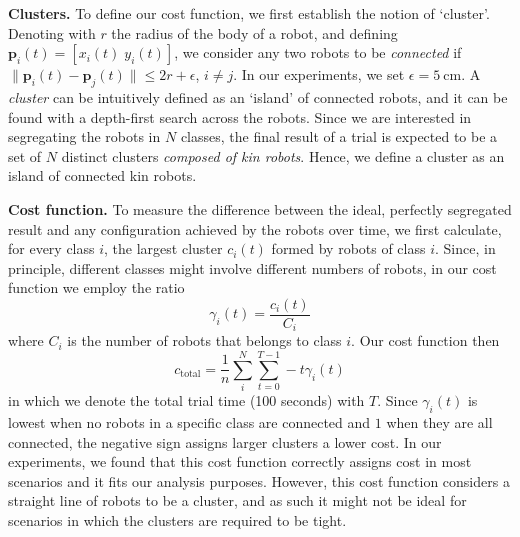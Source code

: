 \documentclass[conference]{IEEEtran}
\newcommand{\myparagraph}[1]{\textbf{#1.}}
\renewcommand{\vec}[1]{\ensuremath{\mathbf{#1}}}
\begin{document}
\myparagraph{Clusters}
To define our cost function, we first establish the notion of
`cluster'. Denoting with $r$ the radius of the body of a robot, and defining
$\vec{p}_i(t) = [x_i(t)\;y_i(t)]$, we consider any two robots to be
\emph{connected} if $\lVert\vec{p}_i(t) - \vec{p}_j(t)\rVert \le 2r + \epsilon$,
$i \ne j$. In our experiments, we set $\epsilon = \SI{5}{\centi\meter}$.  A
\emph{cluster} can be intuitively defined as an `island' of connected robots,
and it can be found with a depth-first search across the robots. Since we are
interested in segregating the robots in $N$ classes, the final result of a trial
is expected to be a set of $N$ distinct clusters \emph{composed of kin
  robots}. Hence, we define a cluster as an island of connected kin robots.

\myparagraph{Cost function}
To measure the difference between the ideal, perfectly segregated result and any
configuration achieved by the robots over time, we first calculate, for every
class $i$, the largest cluster $c_i(t)$ formed by robots of class $i$.  Since,
in principle, different classes might involve different numbers of robots, in
our cost function we employ the ratio
$$
\gamma_i(t) = \frac{c_i(t)}{C_i}
$$
where $C_i$ is the number of robots that belongs to class $i$. Our cost function
then
\begin{equation}
  \label{eq:cost_function}
  c_{\text{total}} =  \frac{1}{n}\sum_i^N\sum_{t=0}^{T-1} -t \gamma_i(t)
\end{equation}
in which we denote the total trial time (100 seconds) with $T$. Since
$\gamma_i(t)$ is lowest when no robots in a specific class are connected and $1$
when they are all connected, the negative sign assigns larger clusters a lower
cost. In our experiments, we found that this cost function correctly assigns
cost in most scenarios and it fits our analysis purposes. However, this cost
function considers a straight line of robots to be a cluster, and as such it
might not be ideal for scenarios in which the clusters are required to be tight.
\end{document}
